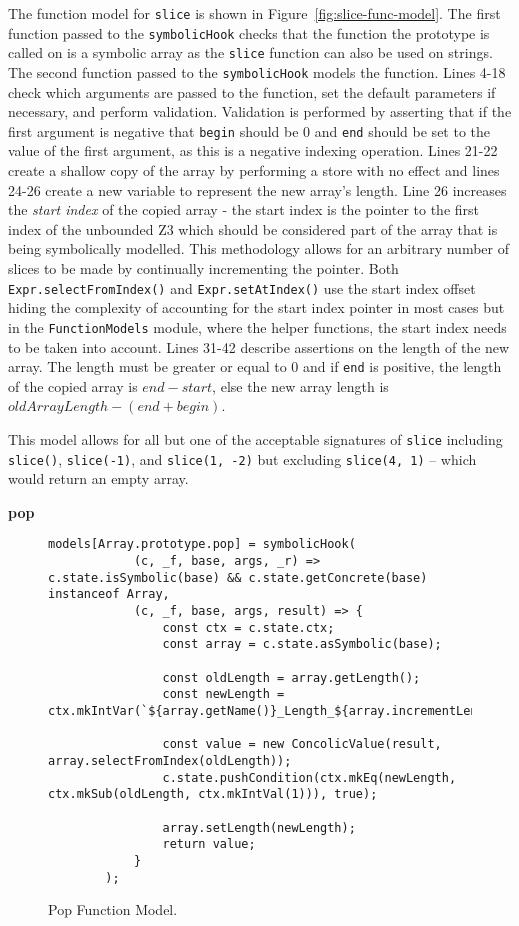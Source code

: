 \documentclass[]{final_report}
\begin{document}
The function model for \lstinline|slice| is shown in Figure~\ref{fig:slice-func-model}. The first function passed to the \lstinline|symbolicHook| checks that the function the prototype is called on is a symbolic array as the \lstinline|slice| function can also be used on strings. The second function passed to the \lstinline|symbolicHook| models the function. Lines 4-18 check which arguments are passed to the function, set the default parameters if necessary, and perform validation. Validation is performed by asserting that if the first argument is negative that \lstinline|begin| should be 0 and \lstinline|end| should be set to the value of the first argument, as this is a negative indexing operation. Lines 21-22 create a shallow copy of the array by performing a store with no effect and lines 24-26 create a new variable to represent the new array's length. Line 26 increases the \textit{start index} of the copied array - the start index is the pointer to the first index of the unbounded Z3 which should be considered part of the array that is being symbolically modelled. This methodology allows for an arbitrary number of slices to be made by continually incrementing the pointer. Both \lstinline|Expr.selectFromIndex()| and \lstinline|Expr.setAtIndex()| use the start index offset hiding the complexity of accounting for the start index pointer in most cases but in the \lstinline|FunctionModels| module, where the helper functions, the start index needs to be taken into account. Lines 31-42 describe assertions on the length of the new array. The length must be greater or equal to 0 and if \lstinline|end| is positive, the length of the copied array is $end - start$, else the new array length is $oldArrayLength - (end + begin)$.

This model allows for all but one of the acceptable signatures of \lstinline|slice| including \lstinline|slice()|, \lstinline|slice(-1)|, and \lstinline|slice(1, -2)| but excluding \lstinline|slice(4, 1)| -- which would return an empty array.

\textbf{pop}
\begin{figure}[t]
\begin{lstlisting}
models[Array.prototype.pop] = symbolicHook(
            (c, _f, base, args, _r) => c.state.isSymbolic(base) && c.state.getConcrete(base) instanceof Array,
            (c, _f, base, args, result) => {
                const ctx = c.state.ctx;
                const array = c.state.asSymbolic(base);

                const oldLength = array.getLength();
                const newLength = ctx.mkIntVar(`${array.getName()}_Length_${array.incrementLengthCounter()}`);

                const value = new ConcolicValue(result, array.selectFromIndex(oldLength));
                c.state.pushCondition(ctx.mkEq(newLength, ctx.mkSub(oldLength, ctx.mkIntVal(1))), true);
                
                array.setLength(newLength);
                return value;
            }
        );
\end{lstlisting}
\caption{\label{fig:pop-func-model} Pop Function Model.}
\end{figure}
\end{document}
